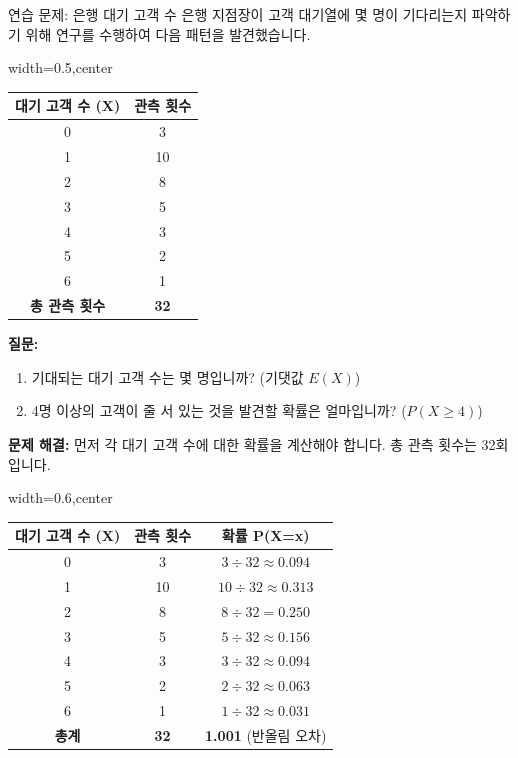 \documentclass[11pt,a4paper]{article}
\theoremstyle{definition}
\begin{document}
\begin{examplebox}{연습 문제: 은행 대기 고객 수}
은행 지점장이 고객 대기열에 몇 명이 기다리는지 파악하기 위해 연구를 수행하여 다음 패턴을 발견했습니다.

\begin{adjustbox}{width=0.5\textwidth,center}
\begin{tabular}{cc}
\toprule
\textbf{대기 고객 수 (X)} & \textbf{관측 횟수} \\
\midrule
0 & 3 \\
1 & 10 \\
2 & 8 \\
3 & 5 \\
4 & 3 \\
5 & 2 \\
6 & 1 \\
\midrule
\textbf{총 관측 횟수} & \textbf{32} \\
\bottomrule
\end{tabular}
\end{adjustbox}

\textbf{질문:}
\begin{enumerate}
    \item 기대되는 대기 고객 수는 몇 명입니까? (기댓값 \(E(X)\))
    \item 4명 이상의 고객이 줄 서 있는 것을 발견할 확률은 얼마입니까? (\(P(X \ge 4)\))
\end{enumerate}

\textbf{문제 해결:}
먼저 각 대기 고객 수에 대한 확률을 계산해야 합니다. 총 관측 횟수는 32회입니다.

\begin{adjustbox}{width=0.6\textwidth,center}
\begin{tabular}{ccc}
\toprule
\textbf{대기 고객 수 (X)} & \textbf{관측 횟수} & \textbf{확률 P(X=x)} \\
\midrule
0 & 3 & \(3 \div 32 \approx 0.094\) \\
1 & 10 & \(10 \div 32 \approx 0.313\) \\
2 & 8 & \(8 \div 32 = 0.250\) \\
3 & 5 & \(5 \div 32 \approx 0.156\) \\
4 & 3 & \(3 \div 32 \approx 0.094\) \\
5 & 2 & \(2 \div 32 \approx 0.063\) \\
6 & 1 & \(1 \div 32 \approx 0.031\) \\
\midrule
\textbf{총계} & \textbf{32} & \textbf{1.001} (반올림 오차) \\
\bottomrule
\end{tabular}
\end{adjustbox}


\end{examplebox}
\end{document}
